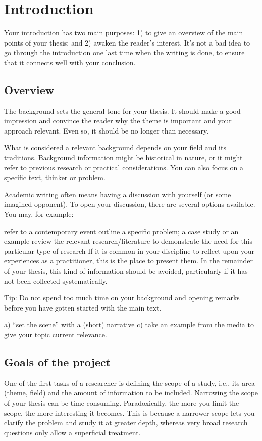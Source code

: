 \chapter{Introduction}
\label{chap:intro}

Your introduction has two main purposes: 1) to give an overview of the main points of your thesis; and 2) awaken the reader’s interest. It’s not a bad idea to go through the introduction one last time when the writing is done, to ensure that it connects well with your conclusion.

\section{Overview}
The background sets the general tone for your thesis. It should make a good impression and convince the reader why the theme is important and your approach relevant. Even so, it should be no longer than necessary.

What is considered a relevant background depends on your field and its traditions. Background information might be historical in nature, or it might refer to previous research or practical considerations. You can also focus on a specific text, thinker or problem.

Academic writing often means having a discussion with yourself (or some imagined opponent). To open your discussion, there are several options available. You may, for example:

refer to a contemporary event
outline a specific problem; a case study or an example
review the relevant research/literature to demonstrate the need for this particular type of research
If it is common in your discipline to reflect upon your experiences as a practitioner, this is the place to present them. In the remainder of your thesis, this kind of information should be avoided, particularly if it has not been collected systematically.

Tip: Do not spend too much time on your background and opening remarks before you have gotten started with the main text.

a) “set the scene” with a (short) narrative
c) take an example from the media to give your topic current relevance.


\section{Goals of the project}

One of the first tasks of a researcher is defining the scope of a study, i.e., its area (theme, field) and the amount of information to be included. Narrowing the scope of your thesis can be time-consuming. Paradoxically, the more you limit the scope, the more interesting it becomes. This is because a narrower scope lets you clarify the problem and study it at greater depth, whereas very broad research questions only allow a superficial treatment.

